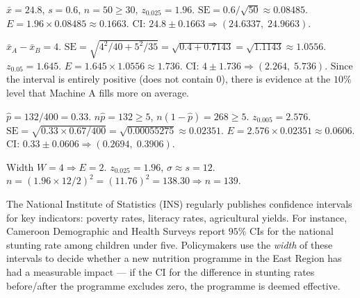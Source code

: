 \documentclass[11pt]{article}
\begin{document}
\begin{corrige}[Exercise 1]
$\bar{x}=24.8$, $s=0.6$, $n=50\ge30$, $z_{0.025}=1.96$.
$\text{SE}=0.6/\sqrt{50}\approx0.08485$.
$E=1.96\times0.08485\approx0.1663$.
CI: $24.8\pm0.1663 \Rightarrow (24.6337,\;24.9663)$.
\end{corrige}

\begin{corrige}[Exercise 2]
$\bar{x}_A-\bar{x}_B=4$. $\text{SE}=\sqrt{4^2/40+5^2/35}=\sqrt{0.4+0.7143}=\sqrt{1.1143}\approx1.0556$.
$z_{0.05}=1.645$. $E=1.645\times1.0556\approx1.736$.
CI: $4\pm1.736 \Rightarrow (2.264,\;5.736)$.
Since the interval is entirely positive (does not contain $0$), there is evidence at the $10\%$ level that Machine A fills more on average.
\end{corrige}

\begin{corrige}[Exercise 3]
$\hat{p}=132/400=0.33$. $n\hat{p}=132\ge5$, $n(1-\hat{p})=268\ge5$.
$z_{0.005}=2.576$. $\text{SE}=\sqrt{0.33\times0.67/400}=\sqrt{0.00055275}\approx0.02351$.
$E=2.576\times0.02351\approx0.0606$.
CI: $0.33\pm0.0606 \Rightarrow (0.2694,\;0.3906)$.
\end{corrige}

\begin{corrige}[Exercise 4]
Width $W=4 \Rightarrow E=2$. $z_{0.025}=1.96$, $\sigma\approx s=12$.
$n=(1.96\times12/2)^2=(11.76)^2=138.30 \Rightarrow n=139$.
\end{corrige}

\begin{savaistu}
The National Institute of Statistics (INS) regularly publishes confidence intervals for key indicators: poverty rates, literacy rates, agricultural yields. For instance, Cameroon Demographic and Health Surveys report $95\%$ CIs for the national stunting rate among children under five. Policymakers use the \emph{width} of these intervals to decide whether a new nutrition programme in the East Region has had a measurable impact — if the CI for the difference in stunting rates before/after the programme excludes zero, the programme is deemed effective.
\end{savaistu}
\end{document}
